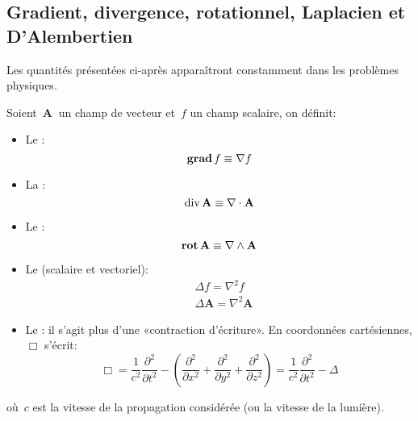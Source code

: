 \medskip
\subsection{Gradient, divergence, rotationnel, Laplacien et D'Alembertien}

Les quantités présentées ci-après apparaîtront constamment dans les problèmes physiques.%

\medskip
Soient~$\mathbf{A}~$ un champ de vecteur et~$f$ un champ scalaire, on définit:
\begin{itemize}
\item Le :
\begin{equation} \operatorname{\mathbf{grad}} f \equiv \nabla f \end{equation}

\item La :
\begin{equation} \operatorname{div} \mathbf{A} \equiv \nabla\cdot\mathbf{A} \end{equation}

\item Le :
\begin{equation} \operatorname{\mathbf{rot}} \mathbf{A} \equiv \nabla \wedge \mathbf{A} \end{equation}

\item Le  (scalaire et vectoriel):
\begin{align} &\Delta f = \nabla^2 f\\
&\Delta \mathbf{A} = \nabla^2 \mathbf{A} \end{align}

\item Le : il s'agit plus d'une «contraction d'écriture».
En coordonnées cartésiennes, $\Box$ s'écrit:
\begin{equation}
  \Box = \frac{1}{c^2}\frac{\partial^2}{\partial t^2} - \left(\frac{\partial^2}{\partial x^2} + \frac{\partial^2}{\partial y^2} + \frac{\partial^2}{\partial z^2}\right)
  = \frac{1}{c^2}\frac{\partial^2}{\partial t^2} - \Delta
\end{equation}
\end{itemize}
où~$c$ est la vitesse de la propagation considérée (ou la vitesse de la lumière).

